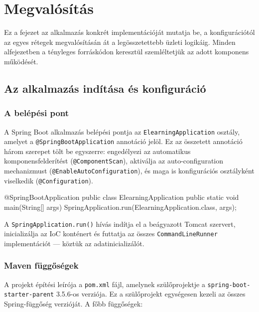 \chapter{Megvalósítás}

Ez a fejezet az alkalmazás konkrét implementációját mutatja be, a konfigurációtól az egyes rétegek megvalósításán át a legösszetettebb üzleti logikáig. Minden alfejezetben a tényleges forráskódon keresztül szemléltetjük az adott komponens működését.

\section{Az alkalmazás indítása és konfiguráció}

\subsection{A belépési pont}

A Spring Boot alkalmazás belépési pontja az \texttt{ElearningApplication} osztály, amelyet a \texttt{@SpringBootApplication} annotáció jelöl. Ez az összetett annotáció három szerepet tölt be egyszerre: engedélyezi az automatikus komponensfelderítést (\texttt{@ComponentScan}), aktiválja az auto-configuration mechanizmust (\texttt{@EnableAutoConfiguration}), és maga is konfigurációs osztályként viselkedik (\texttt{@Configuration}).

\begin{java}[caption={Az alkalmazás belépési pontja},label=java:mainclass]
@SpringBootApplication
public class ElearningApplication {
    public static void main(String[] args) {
        SpringApplication.run(ElearningApplication.class, args);
    }
}
\end{java}

A \texttt{SpringApplication.run()} hívás indítja el a beágyazott Tomcat szervert, inicializálja az IoC konténert és futtatja az összes \texttt{CommandLineRunner} implementációt — köztük az adatinicializálót.

\subsection{Maven függőségek}

A projekt építési leírója a \texttt{pom.xml} fájl, amelynek szülőprojektje a \texttt{spring-boot-starter-parent} 3.5.6-os verziója. Ez a szülőprojekt egységesen kezeli az összes Spring-függőség verzióját. A főbb függőségek:

